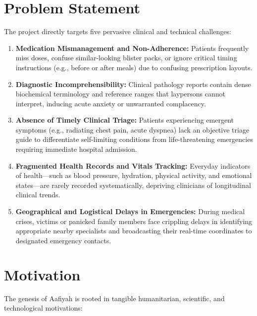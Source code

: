 \documentclass[12pt,a4paper,oneside]{report}
\begin{document}
\chapter{Problem Statement}

The project directly targets five pervasive clinical and technical challenges:

\begin{enumerate}
    \item \textbf{Medication Mismanagement and Non-Adherence:} Patients frequently miss doses, confuse similar-looking blister packs, or ignore critical timing instructions (e.g., before or after meals) due to confusing prescription layouts.
    \item \textbf{Diagnostic Incomprehensibility:} Clinical pathology reports contain dense biochemical terminology and reference ranges that laypersons cannot interpret, inducing acute anxiety or unwarranted complacency.
    \item \textbf{Absence of Timely Clinical Triage:} Patients experiencing emergent symptoms (e.g., radiating chest pain, acute dyspnea) lack an objective triage guide to differentiate self-limiting conditions from life-threatening emergencies requiring immediate hospital admission.
    \item \textbf{Fragmented Health Records and Vitals Tracking:} Everyday indicators of health—such as blood pressure, hydration, physical activity, and emotional states—are rarely recorded systematically, depriving clinicians of longitudinal clinical trends.
    \item \textbf{Geographical and Logistical Delays in Emergencies:} During medical crises, victims or panicked family members face crippling delays in identifying appropriate nearby specialists and broadcasting their real-time coordinates to designated emergency contacts.
\end{enumerate}

\chapter{Motivation}

The genesis of Aafiyah is rooted in tangible humanitarian, scientific, and technological motivations:
\end{document}
